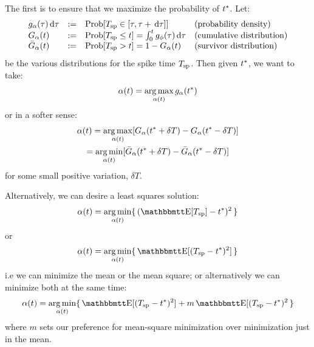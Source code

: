 \documentclass{article}
\begin{document}
The first is to ensure that we maximize the probability of ${ t^* }$. Let:
\begin{equation}
\begin{array}{lcll}
g_{{\alpha}}({\tau}) \, \mathrm{d} {\tau} &:=& \operatorname{Prob}[{ T_{\textrm{sp} } } \in [{\tau}, {\tau} + \, \mathrm{d} {\tau}] ] &
 \textrm{(probability density)} 
\\
G_{{\alpha}}(t) &:=& \operatorname{Prob}[{ T_{\textrm{sp} } } \leq t ] = \int_0^t g_{\phi}({\tau}) \, \mathrm{d} {\tau}
&
 \textrm{(cumulative distribution)}
\\
{ \bar{G} }_{{\alpha}}(t) &:= & \operatorname{Prob}[{ T_{\textrm{sp} } }>t] = 1 - G_{{\alpha}}(t)
&
 \textrm{(survivor distribution)}
\end{array}
\label{eq:ISI_distribution_functions}
\end{equation}
be the various distributions for the spike time ${ T_{\textrm{sp} } }$. Then given ${ t^* }$, we want
to take:
\begin{equation}
\a(t) = \argmax_{\a(t)}  g_{\a}(\T)
\label{eq:OC_MLE_density} 
\end{equation}
or in a softer sense:
\begin{multline}
\a(t) = \argmax_{\a(t)}  [G_{\a}(\T+\delta T) - G_{\a}(\T-\delta T)]
\\ 
	  = \argmin_{\a(t)} [\G_{\a}(\T+\delta T) - \G_{\a}(\T-\delta T)]
\label{eq:OC_MLE_distribution} 
\end{multline}
for some small positive variation,  $\delta T$. 

Alternatively, we can desire a least squares solution:
\begin{equation}
\a(t) = \argmin_{\a(t)} \{ \,(\Exp[\ts] - \T)^2  \, \}
\label{eq:OC_LS_mean}   
\end{equation}
or 
\begin{equation}
\a(t) = \argmin_{\a(t)} \{\, \Exp[(\ts- \T)^2] \,\}
\label{eq:OC_LS_variance}   
\end{equation}
i.e we can minimize the mean or the mean square; or alternatively we can
minimize both at the same time:
\begin{equation}
\a(t) = \argmin_{\a(t)} \{\, \Exp[(\ts- \T)^2  ] + m \Exp[(\ts- \T)^2 \,\}
\label{eq:OC_LS_mean-variance}   
\end{equation}
where $m$ sets our preference for mean-square minimization over minimization
just in the mean.

\end{document}
